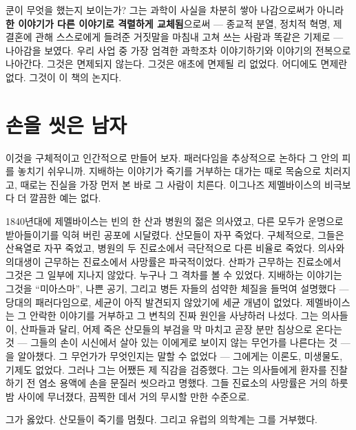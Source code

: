 쿤이 무엇을 했는지 보이는가? 그는 과학이 사실을 차분히 쌓아 나감으로써가 아니라 \textbf{한 이야기가 다른 이야기로 격렬하게 교체됨}으로써 — 종교적 분열, 정치적 혁명, 제 결혼에 관해 스스로에게 들려준 거짓말을 마침내 고쳐 쓰는 사람과 똑같은 기제로 — 나아감을 보였다. 우리 사업 중 가장 엄격한 과학조차 이야기하기와 이야기의 전복으로 나아간다. 그것은 면제되지 않는다. 그것은 애초에 면제될 리 없었다. 어디에도 면제란 없다. 그것이 이 책의 논지다.

\section*{손을 씻은 남자}

이것을 구체적이고 인간적으로 만들어 보자. 패러다임을 추상적으로 논하다 그 안의 피를 놓치기 쉬우니까. 지배하는 이야기가 죽기를 거부하는 대가는 때로 목숨으로 치러지고, 때로는 진실을 가장 먼저 본 바로 그 사람이 치른다. 이그나즈 제멜바이스의 비극보다 더 깔끔한 예는 없다.

1840년대에 제멜바이스는 빈의 한 산과 병원의 젊은 의사였고, 다른 모두가 운명으로 받아들이기를 익혀 버린 공포에 시달렸다. 산모들이 자꾸 죽었다. 구체적으로, 그들은 산욕열로 자꾸 죽었고, 병원의 두 진료소에서 극단적으로 다른 비율로 죽었다. 의사와 의대생이 근무하는 진료소에서 사망률은 파국적이었다. 산파가 근무하는 진료소에서 그것은 그 일부에 지나지 않았다. 누구나 그 격차를 볼 수 있었다. 지배하는 이야기는 그것을 ``미아스마'', 나쁜 공기, 그리고 병든 자들의 섬약한 체질을 들먹여 설명했다 — 당대의 패러다임으로, 세균이 아직 발견되지 않았기에 세균 개념이 없었다. 제멜바이스는 그 안락한 이야기를 거부하고 그 변칙의 진짜 원인을 사냥하러 나섰다. 그는 의사들이, 산파들과 달리, 어제 죽은 산모들의 부검을 막 마치고 곧장 분만 침상으로 온다는 것 — 그들의 손이 시신에서 살아 있는 이에게로 보이지 않는 무언가를 나른다는 것 — 을 알아챘다. 그 무언가가 무엇인지는 말할 수 없었다 — 그에게는 이론도, 미생물도, 기제도 없었다. 그러나 그는 어쨌든 제 직감을 검증했다. 그는 의사들에게 환자를 진찰하기 전 염소 용액에 손을 문질러 씻으라고 명했다. 그들 진료소의 사망률은 거의 하룻밤 사이에 무너졌다, 끔찍한 데서 거의 무시할 만한 수준으로.

그가 옳았다. 산모들이 죽기를 멈췄다. 그리고 유럽의 의학계는 그를 거부했다.

